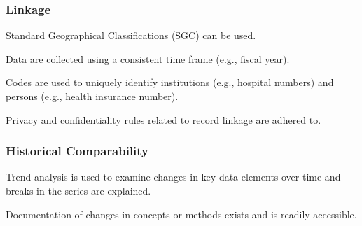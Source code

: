 \subsubsection{Linkage}

\begin{QandA}
    \item Standard Geographical Classifications (SGC) can be used.
    \begin{answered}
        
    \end{answered}

    \item Data are collected using a consistent time frame (e.g., fiscal year).
    \begin{answered}
        
    \end{answered}

    \item Codes are used to uniquely identify institutions (e.g., hospital numbers) and persons (e.g., health insurance number).
    \begin{answered}
        
    \end{answered}

    \item Privacy and confidentiality rules related to record linkage are adhered to.
    \begin{answered}
        
    \end{answered}

\end{QandA}

\subsubsection{Historical Comparability}

\begin{QandA}
    \item Trend analysis is used to examine changes in key data elements over time and breaks in the series are explained.
    \begin{answered}
        
    \end{answered}

    \item Documentation of changes in concepts or methods exists and is readily accessible.
    \begin{answered}
        
    \end{answered}

\end{QandA}

